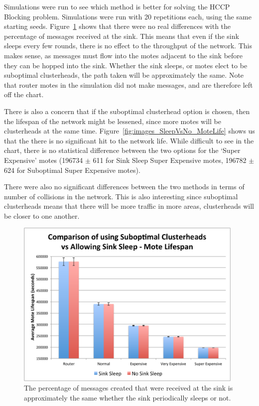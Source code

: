 Simulations were run to see which method is better for solving the HCCP Blocking problem. 
Simulations were run with 20 repetitions each, using the same starting seeds. 
Figure~\ref{fig:images_SleepVsNo_Messages} shows that there were no real differences with 
the percentage of messages received at the sink. This means that even if the sink sleeps
every few rounds, there is no effect to the throughput of the network. This makes 
sense, as messages must flow into the motes adjacent to the sink before they can be 
hopped into the sink. Whether the sink sleeps, or motes elect to be 
suboptimal clusterheads, the path taken will be approximately the same. Note that 
router motes in the simulation did not make messages, and are therefore left off the chart.

There is also a concern that if the suboptimal clusterhead option is chosen, then 
the lifespan of the network might be lessened, since more motes will be clusterheads
at the same time. Figure~\ref{fig:images_SleepVsNo_MoteLife} shows us that 
the there is no significant hit to the network life. While difficult to see in the chart, there 
is no statistical difference between the two options for the `Super Expensive' motes 
(196734 $\pm$ 611 for Sink Sleep Super Expensive motes, 196782 $\pm$ 624 for Suboptimal
Super Expensive motes). 

There were also no significant differences between the two methods in terms of 
number of collisions in the network. This is also interesting since 
suboptimal clusterheads means that there will be more traffic in more areas, clusterheads
will be closer to one another.

\label{sleepVSsubop}
\begin{figure}[htbp]
    \centering
        \includegraphics[height=3.2in]{images/SleepVsNo/Messages.pdf}
    \caption{The percentage of messages created that were received at the sink is approximately the same whether the sink periodically sleeps or not.}
    \label{fig:images_SleepVsNo_Messages}
\end{figure}

